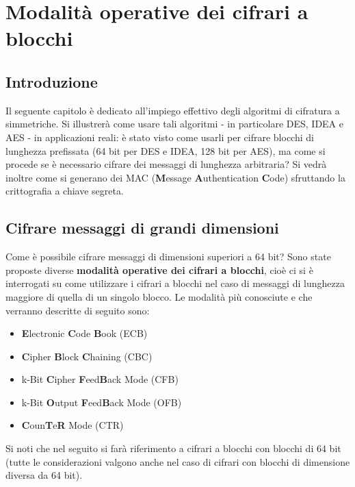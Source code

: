 \chapter{Modalità operative dei cifrari a blocchi} \label{ch:modes}

\section{Introduzione}
Il seguente capitolo è dedicato all'impiego effettivo degli algoritmi di cifratura a simmetriche. Si illustrerà come usare tali algoritmi - in particolare DES, IDEA e AES - in applicazioni reali: è stato visto come usarli per cifrare blocchi di lunghezza prefissata (64 bit per DES e IDEA, 128 bit per AES), ma come si procede se è necessario cifrare dei messaggi di lunghezza arbitraria? \newline \newline
Si vedrà inoltre come si generano dei MAC (\textbf{M}essage \textbf{A}uthentication \textbf{C}ode) sfruttando la crittografia a chiave segreta.

\section{Cifrare messaggi di grandi dimensioni}
Come è possibile cifrare messaggi di dimensioni superiori a 64 bit? Sono state proposte diverse \textbf{modalità operative dei cifrari a blocchi}, cioè ci si è interrogati su come utilizzare i cifrari a blocchi nel caso di messaggi di lunghezza maggiore di quella di un singolo blocco.
\newline \newline
Le modalità più conosciute e che verranno descritte di seguito sono:
\begin{itemize}
  \item \textbf{E}lectronic \textbf{C}ode \textbf{B}ook (ECB)
  \item \textbf{C}ipher \textbf{B}lock \textbf{C}haining (CBC)
  \item k-Bit \textbf{C}ipher \textbf{F}eed\textbf{B}ack Mode (CFB)
  \item k-Bit \textbf{O}utput \textbf{F}eed\textbf{B}ack Mode (OFB)
  \item \textbf{C}oun\textbf{T}e\textbf{R} Mode (CTR)
\end{itemize} 
Si noti che nel seguito si farà riferimento a cifrari a blocchi con blocchi di 64 bit (tutte le considerazioni valgono anche nel caso di cifrari con blocchi di dimensione diversa da 64 bit).
